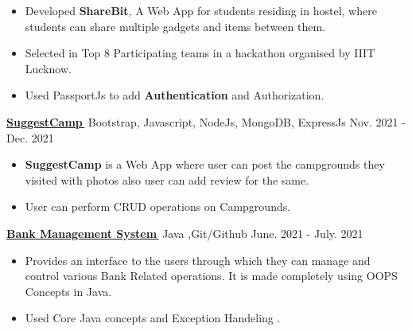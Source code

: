 \documentclass[letterpaper,11pt]{article}
\let\orighref\href
\renewcommand{\href}[2]{\orighref{#1}{#2\,\faExternalLink}}
\begin{document}
{{{    \smallskip
    \begin{itemize}[noitemsep]
    
        \item Developed {\textbf{ShareBit}}, A Web App for students residing in hostel, where students can share multiple gadgets and items between them.
        \item Selected in Top 8 Participating teams in a hackathon organised by IIIT Lucknow.
        \item Used PassportJs to add {\textbf{Authentication}} and  Authorization. 
       
        
    \end{itemize}
\smallskip
\vspace{5}
    
  


  {  \textbf{\href{https://github.com/shankar9834/SuggestCamp}{SuggestCamp}}  \mid Bootstrap, Javascript, NodeJs, MongoDB, ExpressJs \hfill {Nov. 2021 - Dec. 2021}}\\
  
  \smallskip
   
    \begin{itemize}[noitemsep]
    
        \item {\textbf{SuggestCamp}} is a Web App where user can post the campgrounds they visited with photos also user can add review for the same.
        \item User can perform CRUD operations on Campgrounds. 
         
    \end{itemize}
     \smallskip
 \vspace{5}
  { \textbf{\href{https://github.com/shankar9834/BankManagementSystem}{Bank Management System}}  \mid Java ,Git/Github \hfill {June. 2021 - July. 2021}}\\
  
   
    \smallskip
    \begin{itemize}[noitemsep]
    
        \item Provides an interface to the users through which they can manage and control various Bank Related operations. It is made
completely using OOPS Concepts in Java.
        \item Used Core Java concepts and Exception Handeling .
         
    \end{itemize}
    \smallskip
    \vspace{5}
   

}}}
\end{document}
